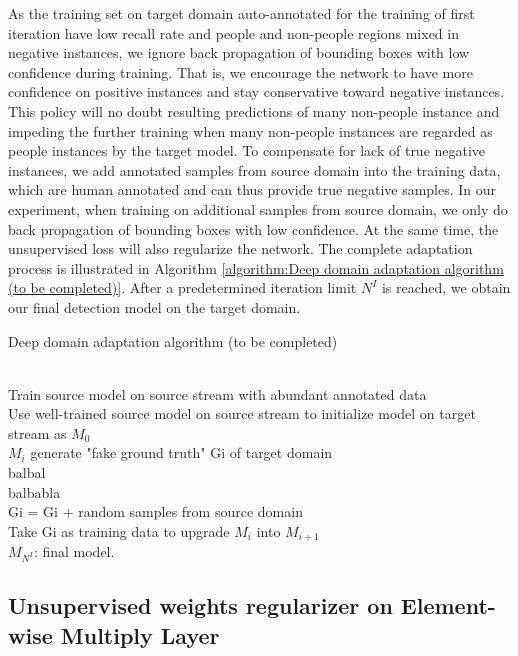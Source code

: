 \documentclass[runningheads]{llncs}
\begin{document}
As the training set on target domain auto-annotated for the training of first iteration have low recall rate and people and non-people regions mixed in negative instances, we ignore back propagation of bounding boxes with low confidence during training. That is, we encourage the network to have more confidence on positive instances and stay conservative toward negative instances. This policy will no doubt resulting predictions of many non-people instance and impeding the further training when many non-people instances are regarded as people instances by the target model. To compensate for lack of true negative instances, we add annotated samples from source domain into the training data, which are human annotated and can thus provide true negative samples. In our experiment, when training on additional samples from source domain, we only do back propagation of bounding boxes with low confidence. At the same time, the unsupervised loss will also regularize the network. The complete adaptation process is illustrated in Algorithm \ref{algorithm:Deep domain adaptation algorithm (to be completed)}. After a predetermined iteration limit $N^{I}$ is reached, we obtain our final detection model on the target domain.

\begin{algorithm}
\caption{Deep domain adaptation algorithm (to be completed)}
\label{algorithm:Deep domain adaptation algorithm (to be completed)}
\begin{algorithmic}[1]
 {} \\
\indent Train source model on source stream with abundant annotated data \\
\indent Use well-trained source model on source stream to initialize model on target stream as $M_{0}$
 \\
\indent \indent $M_{i}$ generate "fake ground truth" Gi of target domain \\
\indent \indent balbal \\
\indent \indent balbabla \\
\indent \indent Gi = Gi + random samples from source domain \\
\indent \indent Take Gi as training data to upgrade $M_{i}$ into $M_{i+1}$
\EndFor \\
\indent $M_{N^{I}}$: final model.
\EndProcedure
\end{algorithmic}
\end{algorithm}


\subsection{Unsupervised weights regularizer on Element-wise Multiply Layer}
\end{document}
